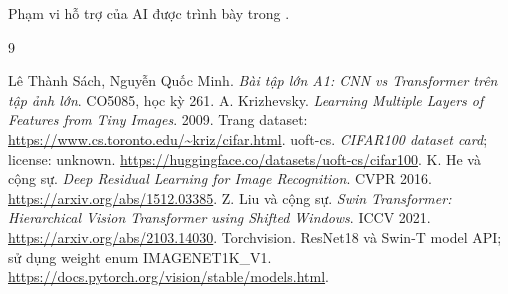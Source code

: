\documentclass[12pt,a4paper]{report}
\begin{document}
Phạm vi hỗ trợ của AI được trình bày trong \href{https://github.com/dathuynh1108/CO5085-deep-learning/blob/main/AI\_USE\_REPORT.md}{}.

\begin{thebibliography}{9}
 Lê Thành Sách, Nguyễn Quốc Minh. \emph{Bài tập lớn A1: CNN vs Transformer trên tập ảnh lớn}. CO5085, học kỳ 261.
 A. Krizhevsky. \emph{Learning Multiple Layers of Features from Tiny Images}. 2009. Trang dataset: \url{https://www.cs.toronto.edu/~kriz/cifar.html}.
 uoft-cs. \emph{CIFAR100 dataset card}; license: unknown. \url{https://huggingface.co/datasets/uoft-cs/cifar100}.
 K. He và cộng sự. \emph{Deep Residual Learning for Image Recognition}. CVPR 2016. \url{https://arxiv.org/abs/1512.03385}.
 Z. Liu và cộng sự. \emph{Swin Transformer: Hierarchical Vision Transformer using Shifted Windows}. ICCV 2021. \url{https://arxiv.org/abs/2103.14030}.
 Torchvision. ResNet18 và Swin-T model API; sử dụng weight enum IMAGENET1K\_V1. \url{https://docs.pytorch.org/vision/stable/models.html}.
\end{thebibliography}
\end{document}
